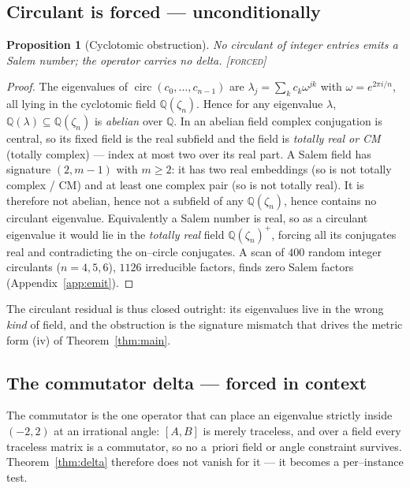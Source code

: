 \documentclass[11pt]{article}
\theoremstyle{plain}
\newtheorem{proposition}[theorem]{Proposition}
\theoremstyle{definition}
\theoremstyle{remark}
\newcommand{\forced}{\textcolor{forcedc}{\textsc{[forced]}}}
\newcommand{\Q}{\mathbb{Q}}
\begin{document}
\subsection{Circulant is forced --- unconditionally}\label{sec:circ}

\begin{proposition}[Cyclotomic obstruction]\label{prop:circ}
No circulant of integer entries emits a Salem number; the operator carries no delta. \forced
\end{proposition}

\begin{proof}
The eigenvalues of $\operatorname{circ}(c_0,\dots,c_{n-1})$ are $\lambda_j=\sum_k c_k\omega^{jk}$ with $\omega=e^{2\pi i/n}$, all lying in the cyclotomic field $\Q(\zeta_n)$. Hence for any eigenvalue $\lambda$, $\Q(\lambda)\subseteq\Q(\zeta_n)$ is \emph{abelian} over $\Q$. In an abelian field complex conjugation is central, so its fixed field is the real subfield and the field is \emph{totally real or CM} (totally complex) --- index at most two over its real part. A Salem field has signature $(2,m-1)$ with $m\ge2$: it has two real embeddings (so is not totally complex / CM) and at least one complex pair (so is not totally real). It is therefore not abelian, hence not a subfield of any $\Q(\zeta_n)$, hence contains no circulant eigenvalue. Equivalently a Salem number is real, so as a circulant eigenvalue it would lie in the \emph{totally real} field $\Q(\zeta_n)^+$, forcing all its conjugates real and contradicting the on--circle conjugates. A scan of $400$ random integer circulants ($n=4,5,6$), $1126$ irreducible factors, finds zero Salem factors (Appendix~\ref{app:emit}). \end{proof}

The circulant residual is thus closed outright: its eigenvalues live in the wrong \emph{kind} of field, and the obstruction is the signature mismatch that drives the metric form (iv) of Theorem~\ref{thm:main}.

\subsection{The commutator delta --- forced in context}\label{sec:comm}

The commutator is the one operator that can place an eigenvalue strictly inside $(-2,2)$ at an irrational angle: $[A,B]$ is merely traceless, and over a field every traceless matrix is a commutator, so no a~priori field or angle constraint survives. Theorem~\ref{thm:delta} therefore does not vanish for it --- it becomes a per--instance test.
\end{document}
